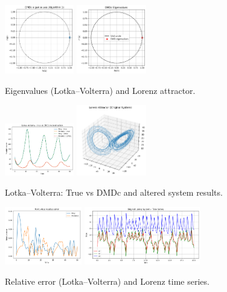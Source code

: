 \documentclass[a4paper,12pt]{report}
\theoremstyle{definition}
\numberwithin{equation}{section}
\begin{document}
\begin{figure}[h!]
    \centering
    \includegraphics[width=0.27\textwidth]{OELV.png}\hspace{2cm}
    \includegraphics[width=0.27\textwidth]{OEL.png}
    \caption{Eigenvalues (Lotka–Volterra) and Lorenz attractor.}

\end{figure}
\begin{figure}[h!]
    \centering
    \includegraphics[width=0.27\textwidth]{OLV.png}\hspace{2cm}
    \includegraphics[width=0.27\textwidth]{OLA.png}
    \caption{Lotka–Volterra: True vs DMDc and altered system results.}
\end{figure}
\begin{figure}[h!]
    \centering
    \includegraphics[width=0.3\textwidth]{POINTWISE LV.png}\hspace{1cm}
    \includegraphics[width=0.45\textwidth]{OLT.png}
   \caption{Relative error (Lotka–Volterra) and Lorenz time series.}
\end{figure}
\newpage
\end{document}
